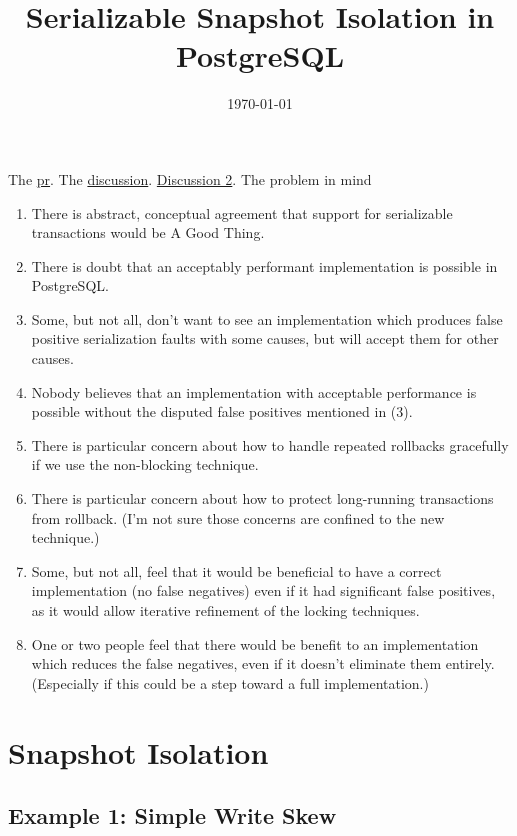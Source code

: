 \documentclass[11pt]{article}
\date{\today}
\title{Serializable Snapshot Isolation in PostgreSQL}
\begin{document}
\maketitle
The \href{https://github.com/postgres/postgres/commit/dafaa3efb75ce1aae2e6dbefaf6f3a889dea0d21}{pr}. The \href{https://www.postgresql.org/message-id/flat/4A0019EE.EE98.0025.0\%40wicourts.gov}{discussion}. \href{https://www.postgresql.org/message-id/flat/4A1D5D8C.EE98.0025.1\%40wicourts.gov}{Discussion 2}.
The problem in mind
\begin{enumerate}
\item There is abstract, conceptual agreement that support for serializable transactions would be A Good
Thing.
\item There is doubt that an acceptably performant implementation is possible in PostgreSQL.
\item Some, but not all, don't want to see an implementation which produces false positive serialization
faults with some causes, but will accept them for other causes.
\item Nobody believes that an implementation with acceptable performance is possible without the disputed
false positives mentioned in (3).
\item There is particular concern about how to handle repeated rollbacks gracefully if we use the non-blocking technique.
\item There is particular concern about how to protect long-running transactions from rollback.  (I'm not
sure those concerns are confined to the new technique.)
\item Some, but not all, feel that it would be beneficial to have a correct implementation (no false
negatives) even if it had significant false positives, as it would allow iterative refinement of
the locking techniques.
\item One or two people feel that there would be benefit to an implementation which reduces the false
negatives, even if it doesn't eliminate them entirely.  (Especially if this could be a step toward
a full implementation.)
\end{enumerate}
\section{Snapshot Isolation}
\label{sec:org4a2cf56}

\subsection{Example 1: Simple Write Skew}
\label{sec:org62aebd7}
\end{document}
